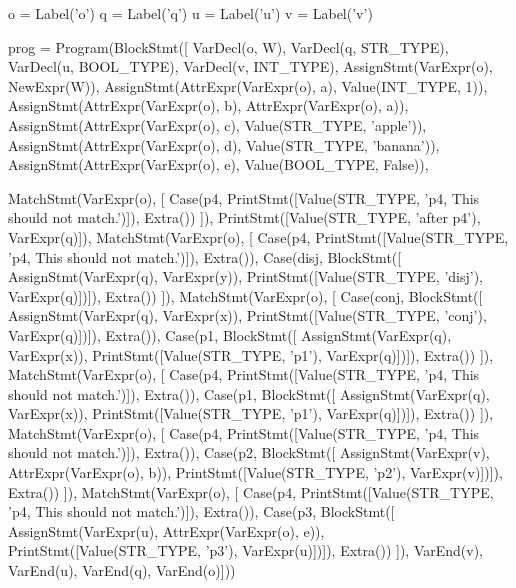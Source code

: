 \begin{dispPy}
    o = Label('o')
    q = Label('q')
    u = Label('u')
    v = Label('v')

    prog = Program(BlockStmt([
        VarDecl(o, W),
        VarDecl(q, STR_TYPE),
        VarDecl(u, BOOL_TYPE),
        VarDecl(v, INT_TYPE),
        AssignStmt(VarExpr(o), NewExpr(W)),
        AssignStmt(AttrExpr(VarExpr(o), a), Value(INT_TYPE, 1)),
        AssignStmt(AttrExpr(VarExpr(o), b), AttrExpr(VarExpr(o), a)),
        AssignStmt(AttrExpr(VarExpr(o), c), Value(STR_TYPE, 'apple')),
        AssignStmt(AttrExpr(VarExpr(o), d), Value(STR_TYPE, 'banana')),
        AssignStmt(AttrExpr(VarExpr(o), e), Value(BOOL_TYPE, False)),

        MatchStmt(VarExpr(o), [
            Case(p4, PrintStmt([Value(STR_TYPE, 'p4, This should not match.')]), Extra())
            ]),
        PrintStmt([Value(STR_TYPE, 'after p4'), VarExpr(q)]),
        MatchStmt(VarExpr(o), [
            Case(p4, PrintStmt([Value(STR_TYPE, 'p4, This should not match.')]), Extra()),
            Case(disj, BlockStmt([
                AssignStmt(VarExpr(q), VarExpr(y)),
                PrintStmt([Value(STR_TYPE, 'disj'), VarExpr(q)])]), Extra())
            ]),
        MatchStmt(VarExpr(o), [
            Case(conj, BlockStmt([
                AssignStmt(VarExpr(q), VarExpr(x)),
                PrintStmt([Value(STR_TYPE, 'conj'), VarExpr(q)])]), Extra()),
            Case(p1, BlockStmt([
                AssignStmt(VarExpr(q), VarExpr(x)),
                PrintStmt([Value(STR_TYPE, 'p1'), VarExpr(q)])]), Extra())
            ]),
        MatchStmt(VarExpr(o), [
            Case(p4, PrintStmt([Value(STR_TYPE, 'p4, This should not match.')]), Extra()),
            Case(p1, BlockStmt([
                AssignStmt(VarExpr(q), VarExpr(x)),
                PrintStmt([Value(STR_TYPE, 'p1'), VarExpr(q)])]), Extra())
            ]),
        MatchStmt(VarExpr(o), [
            Case(p4, PrintStmt([Value(STR_TYPE, 'p4, This should not match.')]), Extra()),
            Case(p2, BlockStmt([
                AssignStmt(VarExpr(v), AttrExpr(VarExpr(o), b)),
                PrintStmt([Value(STR_TYPE, 'p2'), VarExpr(v)])]), Extra())
            ]),
        MatchStmt(VarExpr(o), [
            Case(p4, PrintStmt([Value(STR_TYPE, 'p4, This should not match.')]), Extra()),
            Case(p3, BlockStmt([
                AssignStmt(VarExpr(u), AttrExpr(VarExpr(o), e)),
                PrintStmt([Value(STR_TYPE, 'p3'), VarExpr(u)])]), Extra())
            ]),
        VarEnd(v),
        VarEnd(u),
        VarEnd(q),
        VarEnd(o)]))


\end{dispPy}
